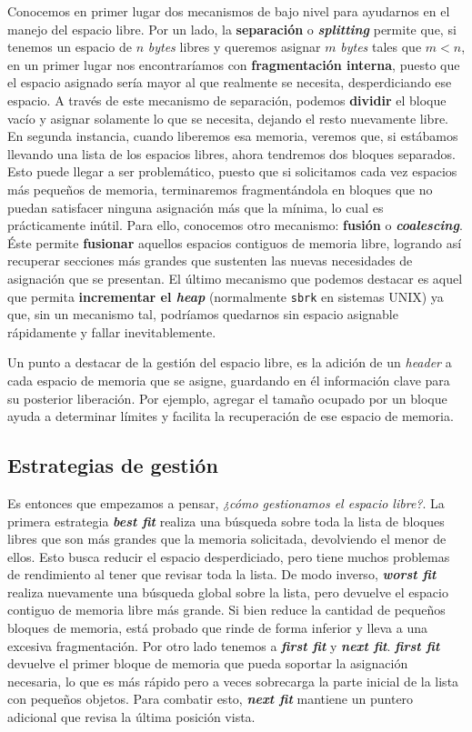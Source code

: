 \documentclass{article}
\begin{document}
{	Conocemos en primer lugar dos mecanismos de bajo nivel para ayudarnos en el manejo del espacio libre. Por un lado, la \textbf{separación} o \textit{\textbf{splitting}} permite que, si tenemos un espacio de $n$ \textit{bytes} libres y queremos asignar $m$ \textit{bytes} tales que $m < n$, en un primer lugar nos encontraríamos con \textbf{fragmentación interna}, puesto que el espacio asignado sería mayor al que realmente se necesita, desperdiciando ese espacio. A través de este mecanismo de separación, podemos \textbf{dividir} el bloque vacío y asignar solamente lo que se necesita, dejando el resto nuevamente libre. En segunda instancia, cuando liberemos esa memoria, veremos que, si estábamos llevando una lista de los espacios libres, ahora tendremos dos bloques separados. Esto puede llegar a ser problemático, puesto que si solicitamos cada vez espacios más pequeños de memoria, terminaremos fragmentándola en bloques que no puedan satisfacer ninguna asignación más que la mínima, lo cual es prácticamente inútil. Para ello, conocemos otro mecanismo: \textbf{fusión} o \textit{\textbf{coalescing}}. Éste permite \textbf{fusionar} aquellos espacios contiguos de memoria libre, logrando así recuperar secciones más grandes que sustenten las nuevas necesidades de asignación que se presentan. El último mecanismo que podemos destacar es aquel que permita \textbf{incrementar el \textit{heap}} (normalmente \lstinline|sbrk| en sistemas UNIX) ya que, sin un mecanismo tal, podríamos quedarnos sin espacio asignable rápidamente y fallar inevitablemente.
	
	Un punto a destacar de la gestión del espacio libre, es la adición de un \textit{header} a cada espacio de memoria que se asigne, guardando en él información clave para su posterior liberación. Por ejemplo, agregar el tamaño ocupado por un bloque ayuda a determinar límites y facilita la recuperación de ese espacio de memoria.
	
	\subsection{Estrategias de gestión}
	
	Es entonces que empezamos a pensar, \textit{¿cómo gestionamos el espacio libre?}.
	La primera estrategia \textit{\textbf{best fit}} realiza una búsqueda sobre toda la lista de bloques libres que son más grandes que la memoria solicitada, devolviendo el menor de ellos. Esto busca reducir el espacio desperdiciado, pero tiene muchos problemas de rendimiento al tener que revisar toda la lista.
	De modo inverso, \textit{\textbf{worst fit}} realiza nuevamente una búsqueda global sobre la lista, pero devuelve el espacio contiguo de memoria libre más grande. Si bien reduce la cantidad de pequeños bloques de memoria, está probado que rinde de forma inferior y lleva a una excesiva fragmentación.
	Por otro lado tenemos a \textit{\textbf{first fit}} y \textit{\textbf{next fit}}. \textit{\textbf{first fit}} devuelve el primer bloque de memoria que pueda soportar la asignación necesaria, lo que es más rápido pero a veces sobrecarga la parte inicial de la lista con pequeños objetos. Para combatir esto, \textit{\textbf{next fit}} mantiene un puntero adicional que revisa la última posición vista.
	
}
\end{document}
